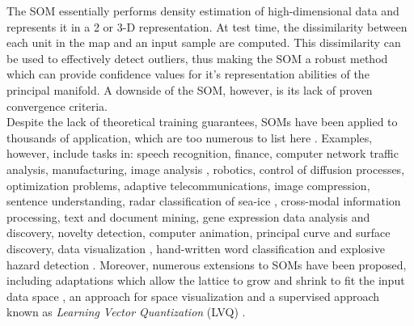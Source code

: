 The SOM essentially performs density estimation of high-dimensional data and represents it in a 2 or 3-D representation.  At test time, the dissimilarity between each unit in the map and an input sample are computed.  This dissimilarity can be used to effectively detect outliers, thus making the SOM a robust method which can provide confidence values for it's representation abilities of the principal manifold.  A downside of the SOM, however, is its lack of proven convergence criteria.  \\

Despite the lack of theoretical training guarantees, SOMs have been applied to thousands of application, which are too numerous to list here \citep{Yin2007SOM}.  Examples, however, include tasks in: speech recognition, finance, computer network traffic analysis, manufacturing, image analysis \citep{Rauber2002GHSOM,Palomo2017GHNG}, robotics, control of diffusion processes, optimization problems, adaptive telecommunications, image compression, sentence understanding, radar classification of sea-ice \citep{Kohonen1990SOM}, cross-modal information processing, text and document mining, gene expression data analysis and discovery, novelty detection, computer animation, principal curve and surface discovery, data visualization \citep{Yin2007SOM}, hand-written word classification \citep{Chiang1997HandWrittenWords} and explosive hazard detection \citep{Frigui2009LandmineSOM}.  Moreover, numerous extensions to SOMs have been proposed, including adaptations which allow the lattice to grow and shrink to fit the input data space \citep{Rauber2002GHSOM}, an approach for space visualization \citep{Yin2007SOM} and a supervised approach known as \textit{Learning Vector Quantization} (LVQ) \citep{Kohonen1995LVQ}.\\

